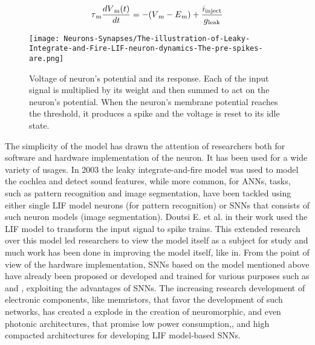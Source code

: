 \documentclass[12pt]{report}
\begin{document}
\vspace{5mm}

\begin{equation}
\tau\textsubscript{m}\frac{dV\textsubscript{m}(t)}{dt}=-(V\textsubscript{m}-E\textsubscript{m})+\frac{i\textsubscript{inject}}{g\textsubscript{leak}}
\end{equation}

\vspace{5mm}

\begin{figure}[htp]
    \centering
    \texttt{[image: Neurons-Synapses/The-illustration-of-Leaky-Integrate-and-Fire-LIF-neuron-dynamics-The-pre-spikes-are.png]}
    \caption{Voltage of neuron's potential and its response. Each of the input signal is multiplied by its weight and then summed to act on the neuron's potential. When the neuron's membrane potential reaches the threshold, it produces a spike and the voltage is reset to its idle state.}
    \label{fig:lif-neuron}
\end{figure}

\medskip

The simplicity of the model has drawn the attention of researchers both for software and hardware implementation of the neuron. It has been used for a wide variety of usages. In 2003 the leaky integrate-and-fire model was used to model the cochlea and detect sound features\cite{sound2003}, while more common, for ANNs, tasks, such as pattern recognition and image segmentation, have been tackled using either single LIF model neurons (for pattern recognition)\cite{pattern2007} or SNNs that consists of such neuron models (image segmentation)\cite{Chaturvedi2012}. Doutsi E. et al. in their work\cite{Doutsi2021} used the LIF model to transform the input signal to spike trains. This extended research over this model led researchers to view the model itself as a subject for study and much work has been done in improving the model itself, like in\cite{Mullowney2008}. From the point of view of the hardware implementation, SNNs based on the model mentioned above have already been proposed or developed and trained for various purposes such as\cite{Liu2019} and \cite{Chu2015}, exploiting the advantages of SNNs. The increasing research development of electronic components, like memristors, that favor the development of such networks\cite{Yang2020}, has created a explode in the creation of neuromorphic, and even photonic architectures\cite{Nahmias2013}, that promise low power consumption\cite{Liu2019},\cite{Chatterjee2019}, and high compacted architectures\cite{Rozenberg2019} for developing LIF model-based SNNs. 
\end{document}
